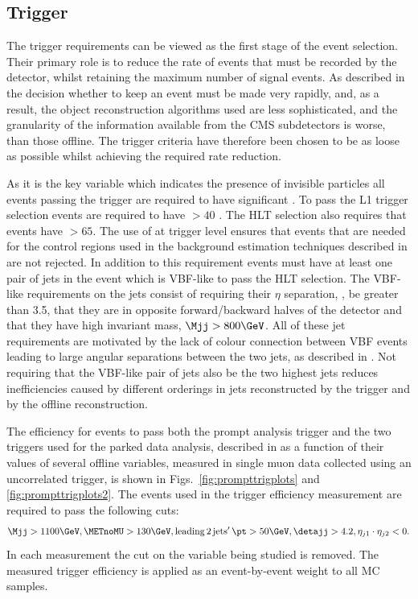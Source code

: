 \subsection{Trigger}
\label{sec:prompttrig}
The trigger requirements can be viewed as the first stage of the event selection. Their primary role is to reduce the rate of events that must be recorded by the detector, whilst retaining the maximum number of signal events. As described in  the decision whether to keep an event must be made very rapidly, and, as a result, the object reconstruction algorithms used are less sophisticated, and the granularity of the information available from the CMS subdetectors is worse, than those offline. The trigger criteria have therefore been chosen to be as loose as possible whilst achieving the required rate reduction.

As it is the key variable which indicates the presence of invisible particles all events passing the trigger are required to have significant \MET. To pass the \ac{L1} trigger selection events are required to have \MET$>40$ \GeV. The \ac{HLT} selection also requires that events have \METnoMU$>65$\GeV. The use of \METnoMU at trigger level ensures that events that are needed for the control regions used in the background estimation techniques described in  are not rejected. In addition to this \METnoMU requirement events must have at least one pair of jets in the event which is \ac{VBF}-like to pass the \ac{HLT} selection. The \ac{VBF}-like requirements on the jets consist of requiring their $\eta$ separation, \detajj, be greater than 3.5, that they are in opposite forward/backward halves of the detector and that they have high invariant mass, $\Mjj>800 \GeV$. All of these jet requirements are motivated by the lack of colour connection between \ac{VBF} events leading to large angular separations between the two jets, as described in . Not requiring that the \ac{VBF}-like pair of jets also be the two highest \pt jets reduces inefficiencies caused by different \pt orderings in jets reconstructed by the trigger and by the offline reconstruction.

The efficiency for events to pass both the prompt analysis trigger and the two triggers used for the parked data analysis, described in  as a function of their values of several offline variables, measured in single muon data collected using an uncorrelated trigger, is shown in Figs.~\ref{fig:prompttrigplots} and \ref{fig:prompttrigplots2}. The events used in the trigger efficiency measurement are required to pass the following cuts:
\begin{equation}
  \label{eq:prompttrigstudycuts}
  \Mjj>1100 \GeV, \METnoMU>130 \GeV, \mathrm{leading\,2\,jets'\,} \pt>50 \GeV, \detajj>4.2,\eta_{j1}\cdot\eta_{j2}<0.
\end{equation}
In each measurement the cut on the variable being studied is removed. The measured trigger efficiency is applied as an event-by-event weight to all \ac{MC} samples.

